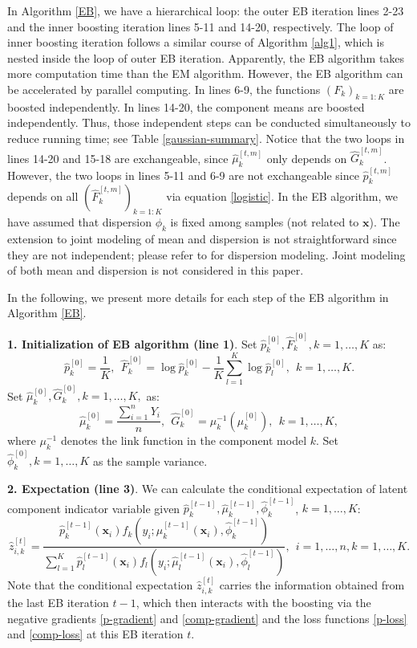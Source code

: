 \documentclass[11pt]{article}
\numberwithin{equation}{section}
\def\bx{\boldsymbol{x}}
\begin{document}
In Algorithm \ref{EB}, we have a hierarchical loop: the outer EB iteration lines 2-23 and the inner boosting iteration lines 5-11 and 14-20, respectively.
The loop of inner boosting iteration follows a similar course of Algorithm \ref{alg1}, which is nested inside the loop of outer EB iteration.
Apparently, the EB algorithm takes more computation time than the EM algorithm. However, the EB algorithm can be accelerated by parallel computing.
In lines 6-9, the functions $(F_k)_{k=1:K}$ are boosted independently. 
In lines 14-20, the component means are boosted independently.
Thus, those independent steps can be conducted simultaneously to reduce running time; see Table \ref{gaussian-summary}.
Notice that the two loops in lines 14-20 and 15-18 are exchangeable, since $\hat{\mu}_k^{[t,m]}$ only depends on $\hat{G}_k^{[t,m]}$. However, the two loops in lines 5-11 and 6-9 are not exchangeable since $\hat{p}_k^{[t,m]}$ depends on all $(\hat{F}_k^{[t,m]})_{k=1:K}$ via equation \eqref{logistic}. In the EB algorithm, we have assumed that dispersion $\phi_k$ is fixed among samples (not related to $\bx$). The extension to joint modeling of mean and dispersion is not straightforward since they are not independent; please refer to \citet{jorgensen:1997} for dispersion modeling.
Joint modeling of both mean and dispersion is not considered in this paper. 

In the following, we present more details for each step of the EB algorithm in Algorithm \ref{EB}.

{\bf 1. Initialization of EB algorithm (line 1)}. Set $\hat{p}_k^{[0]},\hat{F}_k^{[0]}, k=1,\ldots,K$ as:
$$\hat{p}_k^{[0]}=\frac{1}{K},~~
\hat{F}_k^{[0]}=\log \hat{p}_k^{[0]}-\frac{1}{K}\sum_{l=1}^K\log \hat{p}_l^{[0]}, ~~ k=1,\ldots,K.$$
	Set $\hat{\mu}_k^{[0]},\hat{G}_k^{[0]}, k=1,\ldots,K,$ as:
	$$\hat{\mu}_k^{[0]}=\frac{\sum_{i=1}^nY_i}{n},~~\hat{G}_k^{[0]}=\mu_k^{-1}(\hat{\mu}_k^{[0]}),~~ k=1,\ldots,K,$$
	where $\mu^{-1}_k$ denotes the link function in the component model $k$.
		Set $\hat{\phi}_k^{[0]},k=1,\ldots,K$ as the sample variance. 


{\bf 2. Expectation (line 3)}. We can calculate the conditional expectation of latent component indicator variable given  $\hat{p}^{[t-1]}_k,\hat{\mu}^{[t-1]}_k,\hat{\phi}^{[t-1]}_k$, $k=1,\ldots,K$:
	\begin{equation*}
		\hat{z}_{i,k}^{[t]}=\frac{\hat{p}_{k}^{[t-1]}(\bx_i) f_{k}\left(y_i ; \hat{\mu}_{k}^{[t-1]}(\bx_i), \hat{\phi}_k^{[t-1]} \right)}{\sum_{l=1}^{K} \hat{p}_{l}^{[t-1]}(\bx_i) f_{l}\left(y_i ; \hat{\mu}_{l}^{[t-1]}(\bx_i), \hat{\phi}_l^{[t-1]}\right)},~~ i=1,\ldots,n, k=1,\ldots,K.
	\end{equation*}
Note that the conditional expectation $\hat{z}_{i,k}^{[t]}$ carries the information obtained from the last EB iteration $t-1$,
which then  interacts with the boosting via the negative gradients \eqref{p-gradient} and \eqref{comp-gradient} and the loss functions \eqref{p-loss} and \eqref{comp-loss} at this EB iteration $t$.
\end{document}
